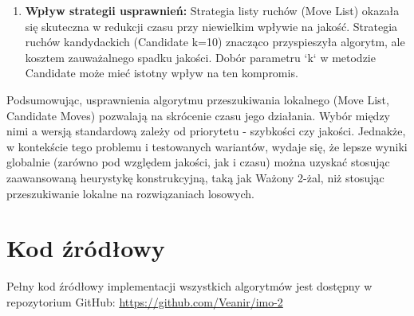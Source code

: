 \documentclass[12pt,a4paper]{article}
\begin{document}
\begin{enumerate}
    \item \textbf{Wpływ strategii usprawnień:} Strategia listy ruchów (Move List) okazała się skuteczna w redukcji czasu przy niewielkim wpływie na jakość. Strategia ruchów kandydackich (Candidate k=10) znacząco przyspieszyła algorytm, ale kosztem zauważalnego spadku jakości. Dobór parametru `k` w metodzie Candidate może mieć istotny wpływ na ten kompromis.

\end{enumerate}

Podsumowując, usprawnienia algorytmu przeszukiwania lokalnego (Move List, Candidate Moves) pozwalają na skrócenie czasu jego działania. Wybór między nimi a wersją standardową zależy od priorytetu - szybkości czy jakości. Jednakże, w kontekście tego problemu i testowanych wariantów, wydaje się, że lepsze wyniki globalnie (zarówno pod względem jakości, jak i czasu) można uzyskać stosując zaawansowaną heurystykę konstrukcyjną, taką jak Ważony 2-żal, niż stosując przeszukiwanie lokalne na rozwiązaniach losowych.

\section{Kod źródłowy}
Pełny kod źródłowy implementacji wszystkich algorytmów jest dostępny w repozytorium GitHub:
\url{https://github.com/Veanir/imo-2}
\end{document}
